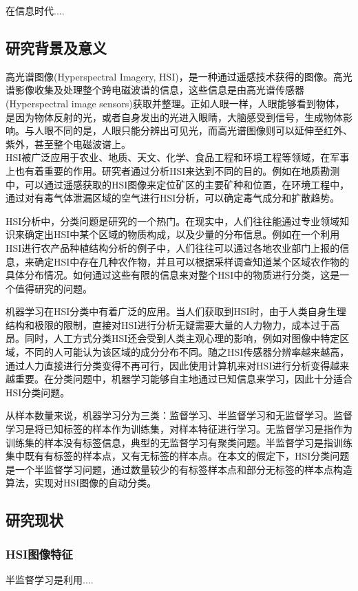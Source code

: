 \documentclass[12pt,a4paper]{article}
\begin{document}
在信息时代....

\subsection{研究背景及意义}
高光谱图像(Hyperspectral Imagery, HSI)，是一种通过遥感技术获得的图像。高光谱影像收集及处理整个跨电磁波谱的信息，这些信息是由高光谱传感器(Hyperspectral image sensors)获取并整理。正如人眼一样，人眼能够看到物体，是因为物体反射的光，或者自身发出的光进入眼睛，大脑感受到信号，生成物体影响。与人眼不同的是，人眼只能分辨出可见光，而高光谱图像则可以延伸至红外、紫外，甚至整个电磁波谱上。\\

HSI被广泛应用于农业、地质、天文、化学、食品工程和环境工程等领域，在军事上也有着重要的作用。研究者通过分析HSI来达到不同的目的。例如在地质勘测中，可以通过遥感获取的HSI图像来定位矿区的主要矿种和位置，在环境工程中，通过对有毒气体泄漏区域的空气进行HSI分析，可以确定毒气成分和扩散趋势。

HSI分析中，分类问题是研究的一个热门。在现实中，人们往往能通过专业领域知识来确定出HSI中某个区域的物质构成，以及少量的分布信息。例如在一个利用HSI进行农产品种植结构分析的例子中，人们往往可以通过各地农业部门上报的信息，来确定HSI中存在几种农作物，并且可以根据采样调查知道某个区域农作物的具体分布情况。如何通过这些有限的信息来对整个HSI中的物质进行分类，这是一个值得研究的问题。

机器学习在HSI分类中有着广泛的应用。当人们获取到HSI时，由于人类自身生理结构和极限的限制，直接对HSI进行分析无疑需要大量的人力物力，成本过于高昂。同时，人工方式分类HSI还会受到人类主观心理的影响，例如对图像中特定区域，不同的人可能认为该区域的成分分布不同。随之HSI传感器分辨率越来越高，通过人力直接进行分类变得不再可行，因此使用计算机来对HSI进行分析变得越来越重要。在分类问题中，机器学习能够自主地通过已知信息来学习，因此十分适合HSI分类问题。

从样本数量来说，机器学习分为三类：监督学习、半监督学习和无监督学习。监督学习是将已知标签的样本作为训练集，对样本特征进行学习。无监督学习是指作为训练集的样本没有标签信息，典型的无监督学习有聚类问题。半监督学习是指训练集中既有有标签的样本点，又有无标签的样本点。在本文的假定下，HSI分类问题是一个半监督学习问题，通过数量较少的有标签样本点和部分无标签的样本点构造算法，实现对HSI图像的自动分类。

\subsection{研究现状}
\subsubsection{HSI图像特征}
半监督学习是利用....
\end{document}
